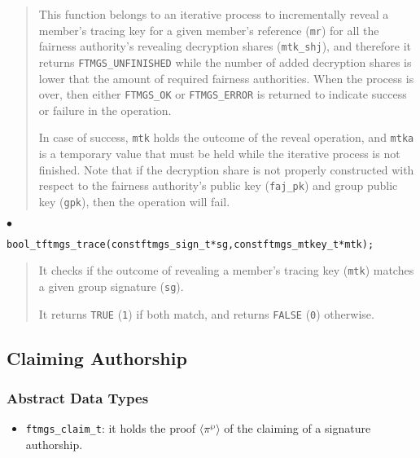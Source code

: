 \documentclass[a4paper]{article}
\newenvironment{api}%
{\noindent$\bullet$\hfill\begin{minipage}[t]{0.97\linewidth}\footnotesize\begin{alltt}}%
{\end{alltt}\end{minipage}}%
\newcommand{\tuple}[1]{\ensuremath{\langle #1 \rangle}}
\begin{document}
\begin{quote}\footnotesize
This function belongs to an iterative process to incrementally reveal
a member's tracing key for a given member's reference (\verb|mr|) for
all the fairness authority's revealing decryption shares (\verb|mtk_shj|),
and therefore it returns \verb|FTMGS_UNFINISHED| while the number of
added decryption shares is lower that the amount of required fairness
authorities. When the process is over, then either \verb|FTMGS_OK| or
\verb|FTMGS_ERROR| is returned to indicate success or failure in the
operation.

In case of success, \verb|mtk| holds the outcome of the reveal
operation, and \verb|mtka| is a temporary value that must be held while
the iterative process is not finished. Note that if the decryption
share is not properly constructed with respect to the fairness
authority's public key (\verb|faj_pk|) and group public key
(\verb|gpk|), then the operation will fail.
\end{quote}
\begin{api}
bool_t ftmgs_trace(const ftmgs_sign_t* sg, const ftmgs_mtkey_t* mtk);
\end{api}
\begin{quote}\footnotesize
It checks if the outcome of revealing a member's tracing key (\verb|mtk|)
matches a given group signature (\verb|sg|).

It returns \verb|TRUE| (\verb|1|) if both match, and returns
\verb|FALSE| (\verb|0|) otherwise.
\end{quote}

\subsection{Claiming Authorship}

\subsubsection*{Abstract Data Types}
\begin{itemize}\small
\item \verb|ftmgs_claim_t|: it holds the proof \tuple{\pi^{\wp}} of
  the claiming of a signature authorship.
\end{itemize}
\end{document}
